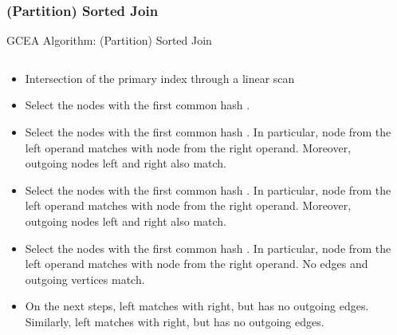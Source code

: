 \subsubsection{(Partition) Sorted Join} 
\begin{frame}{GCEA Algorithm: (Partition) Sorted Join}
	\begin{columns}[T]
		\begin{column}{.4\textwidth}
			
			\begin{itemize}[<only@+>]
				\item \alert{Intersection of the primary index through a linear scan}
				\item Select the nodes with the first common hash .
				\item Select the nodes with the first common hash . In particular, node  from the left operand matches with node
				 from the right operand. Moreover, outgoing nodes  left and  right also match.
				\item Select the nodes with the first common hash . In particular, node  from the left operand matches with node
				 from the right operand. Moreover, outgoing nodes  left and  right also match.
				\item Select the nodes with the first common hash . In particular, node  from the left operand matches with node
				 from the right operand. No edges and outgoing vertices match.
				\item On the next steps,  left matches with  right, but  has no outgoing edges. Similarly,  left matches with \kk{5} right, but  has no outgoing edges.
			\end{itemize}
		\end{column}
		\begin{column}{.3\textwidth}
\end{column}
\end{columns}
\end{frame}
